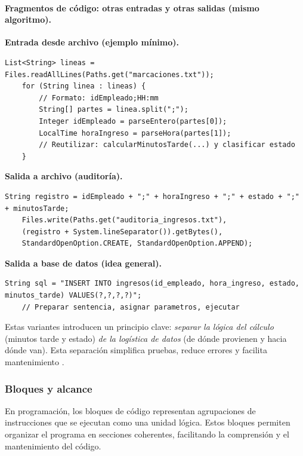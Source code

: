 \documentclass[12pt,twoside]{book}
\begin{document}
						\paragraph{Fragmentos de código: otras entradas y otras salidas (mismo algoritmo).}
						
						\textbf{Entrada desde archivo (ejemplo mínimo).}
						
						\begin{lstlisting}[style=Java,caption={Lectura de marcaciones desde archivo (ejemplo mínimo).},label={lst:EntradaArchivoMin}]
	List<String> lineas = Files.readAllLines(Paths.get("marcaciones.txt"));
	for (String linea : lineas) {
		// Formato: idEmpleado;HH:mm
		String[] partes = linea.split(";");
		Integer idEmpleado = parseEntero(partes[0]);
		LocalTime horaIngreso = parseHora(partes[1]);
		// Reutilizar: calcularMinutosTarde(...) y clasificar estado
	} \end{lstlisting}
						
						\textbf{Salida a archivo (auditoría).}
						
						\begin{lstlisting}[style=Java,caption={Registro de auditoría en archivo (salida persistente).},label={lst:SalidaArchivoMin}]
	String registro = idEmpleado + ";" + horaIngreso + ";" + estado + ";" + minutosTarde;
	Files.write(Paths.get("auditoria_ingresos.txt"),
	(registro + System.lineSeparator()).getBytes(),
	StandardOpenOption.CREATE, StandardOpenOption.APPEND); \end{lstlisting}
						
						\textbf{Salida a base de datos (idea general).}
						
						\begin{lstlisting}[style=Java,caption={Idea general de inserción en BD (salida).},label={lst:SalidaBDIdea}]
	String sql = "INSERT INTO ingresos(id_empleado, hora_ingreso, estado, minutos_tarde) VALUES(?,?,?,?)";
	// Preparar sentencia, asignar parametros, ejecutar \end{lstlisting}
						
						\noindent
						Estas variantes introducen un principio clave: \emph{separar la lógica del cálculo} (minutos tarde y estado) \emph{de la logística de datos} (de dónde provienen y hacia dónde van). Esta separación simplifica pruebas, reduce errores y facilita mantenimiento \cite{Pressman2019Software,Sommerville2015Software,Martin2008Clean}.
						
					\subsubsection{Bloques y alcance}
						\noindent
						En programación, los bloques de código representan agrupaciones de instrucciones que se ejecutan como una unidad lógica. Estos bloques permiten organizar el programa en secciones coherentes, facilitando la comprensión y el mantenimiento del código.
						
\end{document}
